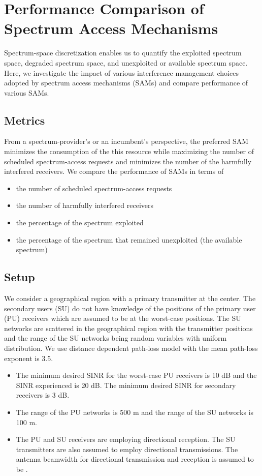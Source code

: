 \documentclass[journal,12pt,draftclsnofoot,onecolumn]{IEEEtran}
\begin{document}
\section{Performance Comparison of Spectrum Access Mechanisms}
Spectrum-space discretization enables us to quantify the exploited spectrum space, degraded spectrum space, and unexploited or available spectrum space. Here, we investigate the impact of various interference management choices adopted by spectrum access mechanisms (SAMs) and compare performance of various SAMs.

\subsection{Metrics}
From a spectrum-provider's or an incumbent's perspective, the preferred SAM minimizes the consumption of the this resource while maximizing the number of scheduled spectrum-access requests and minimizes the number of the harmfully interfered receivers. We compare the performance of SAMs in terms of
\begin{itemize}
	\item the number of scheduled spectrum-access requests
  \item the number of harmfully interfered receivers 
  \item the percentage of the spectrum exploited
	\item the percentage of the spectrum that remained unexploited (the available spectrum)  
\end{itemize}

\subsection{Setup}
We consider a geographical region with a primary transmitter at the center. The secondary users (SU) do not have knowledge of the positions of the primary user (PU) receivers which are assumed to be at the worst-case positions. The SU networks are scattered in the geographical region with the transmitter positions and the range of the SU networks being random variables with uniform distribution. We use distance dependent path-loss model with the mean path-loss exponent is 3.5. 
\begin{itemize}
	\item The minimum desired SINR for the worst-case PU receivers is 10 dB and the SINR experienced is 20 dB. The minimum desired SINR for secondary receivers is 3 dB.
	\item The range of the PU networks is 500 m and the range of the SU networks is 100 m. 
\item The PU and SU receivers are employing directional reception. The SU transmitters are also assumed to employ directional transmissions. The antenna beamwidth for directional transmission and reception is assumed to be . 
\end{itemize}
\end{document}
